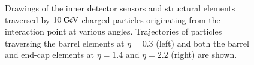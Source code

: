 \begin{figure}[htbp]
	\centering
	\hfill
	\caption{Drawings of the inner detector sensors and structural elements traversed by $10 \GeV$ charged particles originating from the interaction point at various angles. Trajectories of particles traversing the barrel elements at $\eta=0.3$ (left) and both the barrel and end-cap elements at $\eta=1.4$ and $\eta=2.2$ (right) are shown.}
	\label{fig:ATLAS-ID-tracks}
\end{figure}


